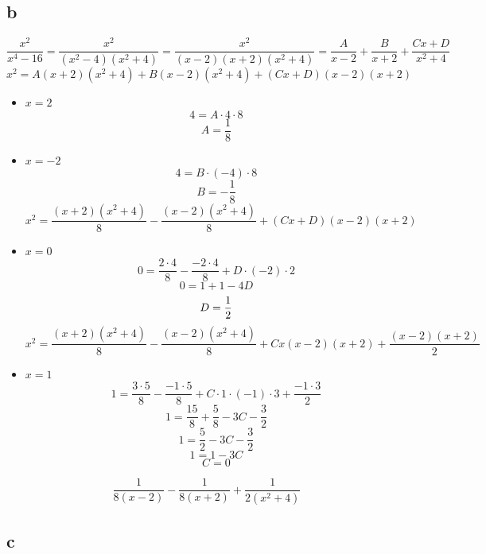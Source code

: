 \subsection{b}

$$ \frac{x^2}{x^4 - 16} = \frac{x^2}{(x^2 - 4)(x^2 + 4)} = \frac{x^2}{(x - 2)(x + 2)(x^2 + 4)} = \frac{A}{x - 2} + \frac{B}{x + 2} + \frac{Cx + D}{x^2 + 4} $$
$$ x^2 = A(x + 2)(x^2 + 4) + B(x - 2)(x^2 + 4) + (Cx + D)(x - 2)(x + 2) $$
\begin{itemize}
	\item $ x = 2 $
    $$ 4 = A \cdot 4 \cdot 8 $$
    $$ A = \frac18 $$
    \item $ x = -2 $
    $$ 4 = B \cdot (-4) \cdot 8 $$
    $$ B = -\frac18 $$
    $$ x^2 = \frac{(x + 2)(x^2 + 4)}8 - \frac{(x - 2)(x^2 + 4)}8 + (Cx + D)(x - 2)(x + 2) $$
    \item $ x = 0 $
    $$ 0 = \frac{2 \cdot 4}8 - \frac{-2 \cdot 4}8 + D \cdot (-2) \cdot 2 $$
    $$ 0 = 1 + 1 - 4D $$
    $$ D = \frac{1}2 $$
    $$ x^2 = \frac{(x + 2)(x^2 + 4)}8 - \frac{(x - 2)(x^2 + 4)}8 + Cx(x - 2)(x + 2) + \frac{(x - 2)(x + 2)}2 $$
    \item $ x = 1 $
    $$ 1 = \frac{3 \cdot 5}8 - \frac{-1 \cdot 5}8 + C \cdot 1 \cdot (-1) \cdot 3 + \frac{-1 \cdot 3}2 $$
    $$ 1 = \frac{15}8 + \frac58 - 3C - \frac32 $$
    $$ 1 = \frac52 - 3C - \frac32 $$
    $$ 1 = 1 - 3C $$
    $$ C = 0 $$
\end{itemize}
$$ \frac1{8(x - 2)} - \frac1{8(x + 2)} + \frac1{2(x^2 + 4)} $$

\subsection{c}

